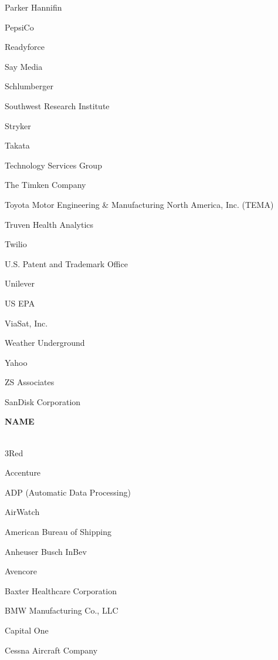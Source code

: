 \documentclass[twoside]{article}
\begin{document}
\begin{center}
\begin{multicols}{5}
\begin{FlushLeft}
\begin{compactitem}
\item Parker Hannifin
\item PepsiCo
\item Readyforce
\item Say Media
\item Schlumberger
\item Southwest Research Institute
\item Stryker
\item Takata
\item Technology Services Group
\item The Timken Company
\item Toyota Motor Engineering \& Manufacturing North America, Inc. (TEMA)
\item Truven Health Analytics
\item Twilio
\item U.S. Patent and Trademark Office
\item Unilever
\item US EPA
\item ViaSat, Inc.
\item Weather Underground
\item Yahoo
\item ZS Associates
\item SanDisk Corporation
\end{compactitem}
        \end{FlushLeft}
        \vspace{1em}
        {\fontsize{14}{16}\selectfont \bf NAME}\\
        \vspace{-1em}
        ~\hrulefill~
        \vspace{-.9em}
        \begin{FlushLeft}
        \begin{compactitem}
        \item 3Red
\item Accenture
\item ADP (Automatic Data Processing)
\item AirWatch
\item American Bureau of Shipping
\item Anheuser Busch InBev
\item Avencore
\item Baxter Healthcare Corporation
\item BMW Manufacturing Co., LLC
\item Capital One
\item Cessna Aircraft Company

\end{compactitem}
\end{FlushLeft}
\end{multicols}
\end{center}
\end{document}
